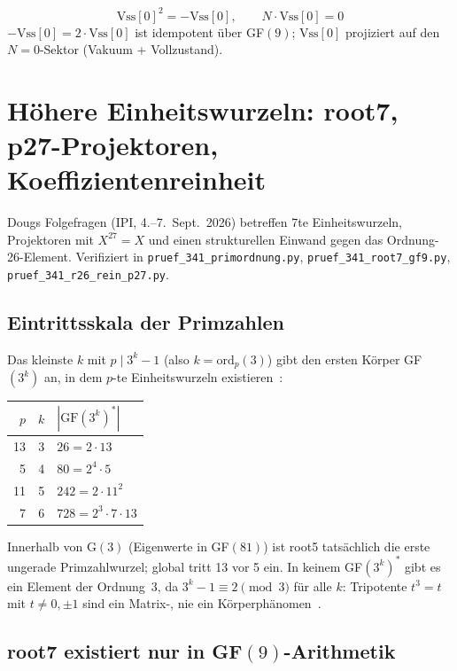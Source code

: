 \begin{equation}
  \text{Vss}[0]^2 = -\text{Vss}[0], \qquad N \cdot \text{Vss}[0] = 0
\end{equation}
$-\text{Vss}[0] = 2\cdot\text{Vss}[0]$ ist idempotent über GF$(9)$;
$\text{Vss}[0]$ projiziert auf den $N=0$-Sektor (Vakuum + Vollzustand).

\section{Höhere Einheitswurzeln: root7, p27-Projektoren, Koeffizientenreinheit}

Dougs Folgefragen (IPI, 4.--7.~Sept.~2026) betreffen 7te Einheitswurzeln,
Projektoren mit $X^{27}=X$ und einen strukturellen Einwand gegen das Ordnung-26-Element.
Verifiziert in \texttt{pruef\_341\_primordnung.py},
\texttt{pruef\_341\_root7\_gf9.py}, \texttt{pruef\_341\_r26\_rein\_p27.py}.

\subsection{Eintrittsskala der Primzahlen}

Das kleinste $k$ mit $p \mid 3^k-1$ (also $k=\mathrm{ord}_p(3)$) gibt den ersten
Körper GF$(3^k)$ an, in dem $p$-te Einheitswurzeln existieren~\BM:
\begin{center}
\begin{tabular}{rcl}
\toprule
$p$ & $k$ & $|\text{GF}(3^k)^*|$ \\
\midrule
13 & 3 & $26 = 2\cdot13$ \\
5  & 4 & $80 = 2^4\cdot5$ \\
11 & 5 & $242 = 2\cdot11^2$ \\
7  & 6 & $728 = 2^3\cdot7\cdot13$ \\
\bottomrule
\end{tabular}
\end{center}
Innerhalb von G$(3)$ (Eigenwerte in GF$(81)$) ist root5 tatsächlich die erste
ungerade Primzahlwurzel; global tritt 13 vor 5 ein. In keinem GF$(3^k)^*$ gibt es
ein Element der Ordnung~3, da $3^k-1 \equiv 2 \pmod 3$ für alle $k$: Tripotente
$t^3=t$ mit $t\neq0,\pm1$ sind ein Matrix-, nie ein Körperphänomen~\BM.

\subsection{root7 existiert nur in GF$(9)$-Arithmetik}

